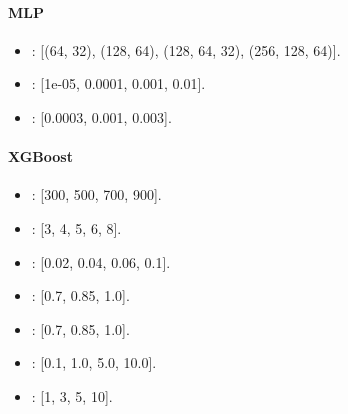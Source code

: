 \paragraph{MLP}

\begin{itemize}

\item {}: [(64, 32), (128, 64), (128, 64, 32), (256, 128, 64)].

\item {}: [1e-05, 0.0001, 0.001, 0.01].

\item {}: [0.0003, 0.001, 0.003].

\end{itemize}

\paragraph{XGBoost}

\begin{itemize}

\item {}: [300, 500, 700, 900].

\item {}: [3, 4, 5, 6, 8].

\item {}: [0.02, 0.04, 0.06, 0.1].

\item {}: [0.7, 0.85, 1.0].

\item {}: [0.7, 0.85, 1.0].

\item {}: [0.1, 1.0, 5.0, 10.0].

\item {}: [1, 3, 5, 10].

\end{itemize}
